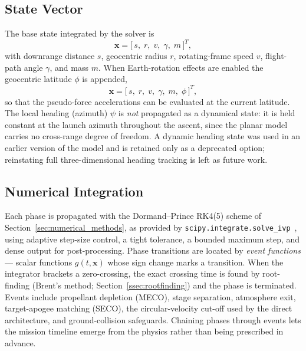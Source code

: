 \subsection{State Vector}
\label{ssec:state_vector}

The base state integrated by the solver is
\begin{equation}
  \mathbf{x} = \bigl[\,s,\; r,\; v,\; \gamma,\; m\,\bigr]^{T},
  \label{eq:state_base}
\end{equation}
with downrange distance $s$, geocentric radius $r$, rotating-frame speed $v$,
flight-path angle $\gamma$, and mass $m$. When Earth-rotation effects are enabled
the geocentric latitude $\phi$ is appended,
\begin{equation}
  \mathbf{x} = \bigl[\,s,\; r,\; v,\; \gamma,\; m,\; \phi\,\bigr]^{T},
  \label{eq:state_rot}
\end{equation}
so that the pseudo-force accelerations can be evaluated at the current latitude.
The local heading (azimuth) $\psi$ is \emph{not} propagated as a dynamical state:
it is held constant at the launch azimuth throughout the ascent, since the planar
model carries no cross-range degree of freedom. A dynamic heading state was used
in an earlier version of the model and is retained only as a deprecated option;
reinstating full three-dimensional heading tracking is left as future work.

\subsection{Numerical Integration}
\label{ssec:integration_sim}

Each phase is propagated with the Dormand--Prince RK4(5) scheme of
Section~\ref{sec:numerical_methods}, as provided by
\texttt{scipy.integrate.solve\_ivp}~\cite{virtanen2020scipy}, using adaptive
step-size control, a tight tolerance, a bounded maximum step, and dense output for
post-processing. Phase transitions are located by \emph{event functions} --- scalar
functions $g(t,\mathbf{x})$ whose sign change marks a transition. When the
integrator brackets a zero-crossing, the exact crossing time is found by
root-finding (Brent's method; Section~\ref{ssec:rootfinding}) and the phase is
terminated. Events include propellant depletion
(MECO), stage separation, atmosphere exit, target-apogee matching (SECO), the
circular-velocity cut-off used by the direct architecture, and ground-collision
safeguards. Chaining phases through events lets the mission timeline emerge from
the physics rather than being prescribed in advance.

